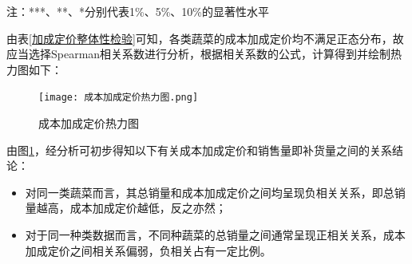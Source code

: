 \documentclass{my_paper}
\begin{document}
\vspace{-0.5cm}
 注：***、**、*分别代表1\%、5\%、10\%的显著性水平\par
 由表\ref{加成定价整体性检验}可知，各类蔬菜的成本加成定价均不满足正态分布，故应当选择Spearman相关系数进行分析，根据相关系数的公式，计算得到并绘制热力图如下：
 \begin{figure}[H]
 \centering
 \texttt{[image: 成本加成定价热力图.png]} 
 \caption{成本加成定价热力图} %
 \label{成本加成定价热力图} %
\end{figure}\par
由图\ref{成本加成定价热力图}，经分析可初步得知以下有关成本加成定价和销售量即补货量之间的关系结论：
\begin{itemize}
    \item 对同一类蔬菜而言，其总销量和成本加成定价之间均呈现负相关关系，即总销量越高，成本加成定价越低，反之亦然；
    \item 对于同一种类数据而言，不同种蔬菜的总销量之间通常呈现正相关关系，成本加成定价之间相关系偏弱，负相关占有一定比例。
\end{itemize}
\end{document}
